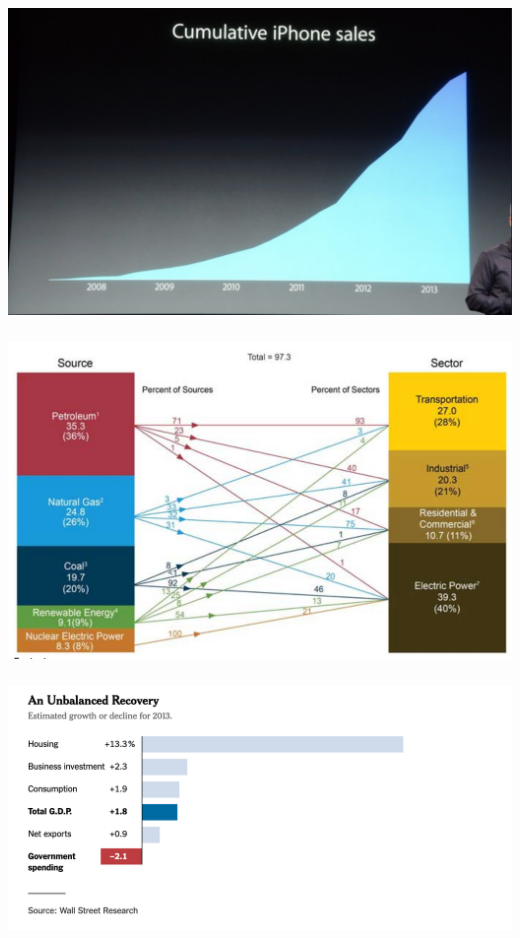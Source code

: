 \documentclass[t, 11pt]{beamer}
\begin{document}
\begin{frame} 
	\frametitle{\insertsection} 
	\begin{center}
		\includegraphics[scale=0.4]{iphone}
	\end{center}
\end{frame}

\begin{frame} 
	\frametitle{\insertsection} 
	\begin{center}
		\includegraphics[scale=0.4]{bad_sankey}
	\end{center}
\end{frame}

\begin{frame} 
	\frametitle{\insertsection} 
	\begin{center}
		\includegraphics[scale=0.5]{good1}
	\end{center}
\end{frame}
\end{document}
